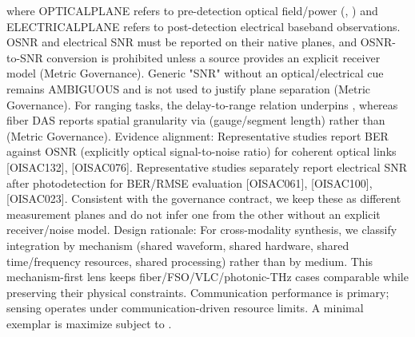 {}where OPTICAL\markdownRendererUnderscore{}PLANE refers to pre-detection optical field/power (, ) and ELECTRICAL\markdownRendererUnderscore{}PLANE refers to post-detection electrical baseband observations. OSNR and electrical SNR must be reported on their native planes, and OSNR-to-SNR conversion is prohibited unless a source provides an explicit receiver model (Metric Governance). Generic "SNR" without an optical/electrical cue remains AMBIGUOUS and is not used to justify plane separation (Metric Governance). For ranging tasks, the delay-to-range relation  underpins , whereas fiber DAS reports spatial granularity via  (gauge/segment length) rather than  (Metric Governance).\markdownRendererParagraphSeparator
{}Evidence alignment: Representative studies report BER against OSNR (explicitly optical signal-to-noise ratio) for coherent optical links [O\markdownRendererUnderscore{}ISAC\markdownRendererUnderscore{}132], [O\markdownRendererUnderscore{}ISAC\markdownRendererUnderscore{}076].\markdownRendererSoftLineBreak
{}Representative studies separately report electrical SNR after photodetection for BER/RMSE evaluation [O\markdownRendererUnderscore{}ISAC\markdownRendererUnderscore{}061], [O\markdownRendererUnderscore{}ISAC\markdownRendererUnderscore{}100], [O\markdownRendererUnderscore{}ISAC\markdownRendererUnderscore{}023]. Consistent with the governance contract, we keep these as different measurement planes and do not infer one from the other without an explicit receiver/noise model.\markdownRendererInterblockSeparator
{}
\markdownRendererSectionEnd \markdownRendererSectionBegin
{}\markdownRendererInterblockSeparator
{}Design rationale: For cross-modality synthesis, we classify integration by mechanism (shared waveform, shared hardware, shared time/frequency resources, shared processing) rather than by medium. This mechanism-first lens keeps fiber/FSO/VLC/photonic-THz cases comparable while preserving their physical constraints.\markdownRendererParagraphSeparator
{} Communication performance is primary; sensing operates under communication-driven resource limits. A minimal exemplar is maximize  subject to .\markdownRendererParagraphSeparator
